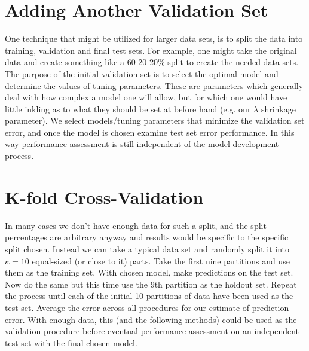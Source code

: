 \documentclass[english,nohyper,titlepage]{tufte-handout}\usepackage{knitr}
\begin{document}
\section{Adding Another Validation Set}
One technique that might be utilized for larger data sets, is to split the data into training, validation and final test sets.  For example, one might take the original data and create something like a 60-20-20\% split to create the needed data sets.  The purpose of the initial validation set is to select the optimal model and determine the values of tuning parameters.  These are parameters which generally deal with how complex a model one will allow, but for which one would have little inkling as to what they should be set at before hand (e.g. our $\lambda$ shrinkage parameter).  We select models/tuning parameters that minimize the validation set error, and once the model is chosen examine test set error performance.  In this way performance assessment is still independent of the model development process.

\section{K-fold Cross-Validation}
In many cases we don't have enough data for such a split, and the split percentages are arbitrary anyway and results would be specific to the specific split chosen.  Instead we can take a typical data set and randomly split it into $\kappa=10$ equal-sized (or close to it) parts.  Take the first nine partitions and use them as the training set.  With chosen model, make predictions on the test set.  Now do the same but this time use the 9th partition as the holdout set. Repeat the process until each of the initial 10 partitions of data have been used as the test set.  Average the error across all procedures for our estimate of prediction error.  With enough data, this (and the following methods) could be used as the validation procedure before eventual performance assessment on an independent test set with the final chosen model.
\end{document}
